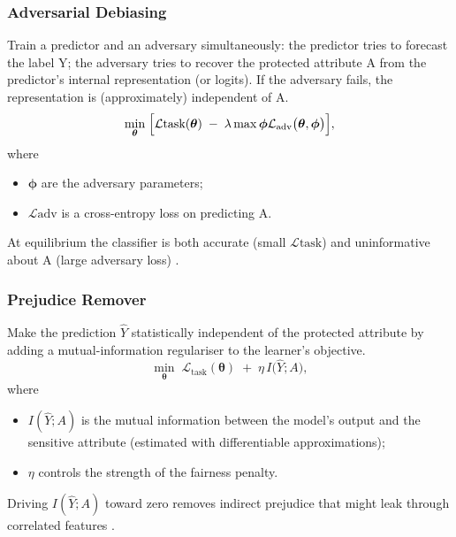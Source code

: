 \documentclass[12pt,a4paper,openright,twoside]{book}
\begin{document}
\subsubsection{Adversarial Debiasing} Train a predictor and an adversary simultaneously: the predictor tries to forecast the label Y; the adversary tries to recover the protected attribute A from the predictor’s internal representation (or logits). If the adversary fails, the representation is (approximately) independent of A.
\begin{equation}
    \min_{\boldsymbol\theta}\;
    \Bigl[
    \mathcal{L}{\text{task}}(\boldsymbol\theta)
    \;-\;
    \lambda
    \max{\boldsymbol\phi}
    \mathcal{L}_{\text{adv}}\bigl(\boldsymbol\theta,\boldsymbol\phi\bigr)
    \Bigr],
\end{equation}
where
\begin{itemize}
    \item \begin{math}\boldsymbol\phi\end{math} are the adversary parameters;
    \item \begin{math}\mathcal{L}{\text{adv}}\end{math} is a cross-entropy loss on predicting A.
\end{itemize}
At equilibrium the classifier is both accurate (small \begin{math}\mathcal{L}{\text{task}}\end{math}) and uninformative about A (large adversary loss) \cite{zhang2018mitigatingunwantedbiasesadversarial}.

\subsubsection{Prejudice Remover} Make the prediction \begin{math}\widehat{Y}\end{math} statistically independent of the protected attribute by adding a mutual-information regulariser to the learner’s objective.
\begin{equation}
    \min_{\boldsymbol\theta}
    \;
    \mathcal{L}_{\text{task}}(\boldsymbol\theta)
    \;+\;
    \eta \, I\!\bigl(\widehat{Y};A\bigr),
\end{equation}
where
\begin{itemize}
    \item \begin{math}I(\widehat{Y};A)\end{math} is the mutual information between the model’s output and the sensitive attribute (estimated with differentiable approximations);
    \item \begin{math}\eta\end{math} controls the strength of the fairness penalty.
\end{itemize}
Driving \begin{math}I(\widehat{Y};A)\end{math} toward zero removes indirect prejudice that might leak through correlated features \cite{kamishima2012prejudiceremoverregularizer}.
\end{document}
